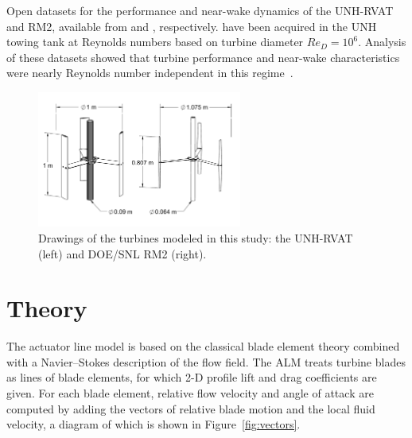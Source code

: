 \documentclass[times]{weauth}
\begin{document}
Open datasets for the performance and near-wake dynamics of the UNH-RVAT and
RM2, available from \cite{Bachant2014-RVAT-baseline,Bachant2016-RVAT-Re-dep} and
\cite{Bachant2016-RM2-data}, respectively. have been acquired in the UNH towing
tank at Reynolds numbers based on turbine diameter $Re_D = 10^6$. Analysis of
these datasets showed that turbine performance and near-wake characteristics
were nearly Reynolds number independent in this
regime~\cite{Bachant2016-Energies,Bachant2016-RM2-paper}.

\begin{figure}
    \centering

    \includegraphics[width=0.6\textwidth]{turbines}

    \caption{Drawings of the turbines modeled in this study: the UNH-RVAT (left)
    and DOE/SNL RM2 (right).}

    \label{fig:turbines}
\end{figure}


\section{Theory}

The actuator line model is based on the classical blade element theory combined
with a Navier--Stokes description of the flow field. The ALM treats turbine
blades as lines of blade elements, for which 2-D profile lift and drag
coefficients are given. For each blade element, relative flow velocity and angle
of attack are computed by adding the vectors of relative blade motion and the
local fluid velocity, a diagram of which is shown in Figure~\ref{fig:vectors}.
\end{document}
